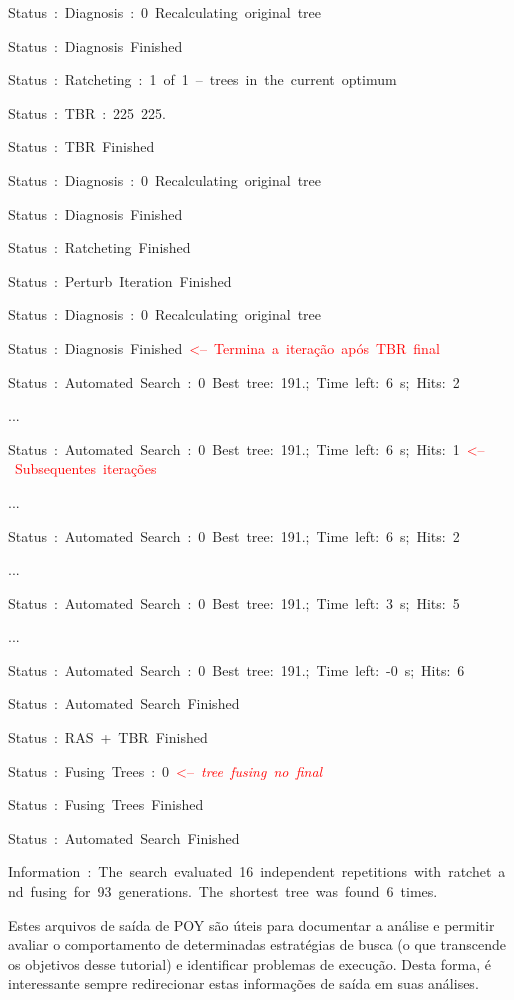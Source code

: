 \begin{refsection}
Status~:~Diagnosis~:~0~Recalculating~original~tree

Status~:~Diagnosis~Finished

Status~:~Ratcheting~:~1~of~1~--~trees~in~the~current~optimum

Status~:~TBR~:~225~225.

Status~:~TBR~Finished

Status~:~Diagnosis~:~0~Recalculating~original~tree

Status~:~Diagnosis~Finished

Status~:~Ratcheting~Finished

Status~:~Perturb~Iteration~Finished

Status~:~Diagnosis~:~0~Recalculating~original~tree

Status~:~Diagnosis~Finished~\textcolor{red}{<--~Termina~a~iteração~após~TBR~final}

Status~:~Automated~Search~:~0~Best~tree:~191.;~Time~left:~6~s;~Hits:~2

...

Status~:~Automated~Search~:~0~Best~tree:~191.;~Time~left:~6~s;~Hits:~1~\textcolor{red}{<--~Subsequentes~iterações}

...

Status~:~Automated~Search~:~0~Best~tree:~191.;~Time~left:~6~s;~Hits:~2

...

Status~:~Automated~Search~:~0~Best~tree:~191.;~Time~left:~3~s;~Hits:~5

...

Status~:~Automated~Search~:~0~Best~tree:~191.;~Time~left:~-0~s;~Hits:~6

Status~:~Automated~Search~Finished

Status~:~RAS~+~TBR~Finished

Status~:~Fusing~Trees~:~0~\textcolor{red}{<--~\textit{tree~fusing~no~final}}

Status~:~Fusing~Trees~Finished

Status~:~Automated~Search~Finished

Information~:~The~search~evaluated~16~independent~repetitions~with~ratchet~and~fusing~for~93~generations.~The~shortest~tree~was~found~6~times.

\normalsize

Estes arquivos de saída de POY são úteis para documentar a análise e permitir avaliar o comportamento de determinadas estratégias de busca (o que transcende os objetivos desse tutorial) e identificar problemas de execução. Desta forma, é interessante sempre redirecionar estas informações de saída em suas análises.



\end{refsection}
